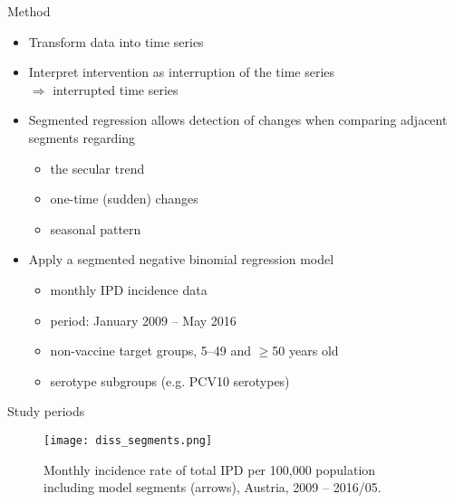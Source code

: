 \documentclass{beamer}\usepackage[]{graphicx}\usepackage[]{color}
\begin{document}
\begin{frame}[fragile]{Method}
\begin{center}
\begin{itemize}
  \item Transform data into time series
  \item Interpret intervention as interruption of the time series\\
  $\Rightarrow$ interrupted time series
  \item Segmented regression allows detection of changes when comparing adjacent segments regarding
  \begin{itemize}
    \item the secular trend
    \item one-time (sudden) changes
    \item seasonal pattern
  \end{itemize}
  \item Apply a segmented negative binomial regression model
  \begin{itemize}
    \item monthly IPD incidence data
    \item period: January 2009 -- May 2016
    \item non-vaccine target groups, 5--49 and $\ge$50 years old
    \item serotype subgroups (e.g. PCV10 serotypes)
  \end{itemize}
\end{itemize}
\end{center}
\end{frame}

\begin{frame}[fragile]{Study periods}
\begin{center}
\begin{figure}
  \centering
  \caption{Monthly incidence rate of total IPD per 100,000 population including model segments (arrows), Austria, 2009 -- 2016/05.}
  \texttt{[image: diss\_segments.png]} %
  \label{fig:IPDsegments}
\end{figure}
\end{center}
\end{frame}
\end{document}
